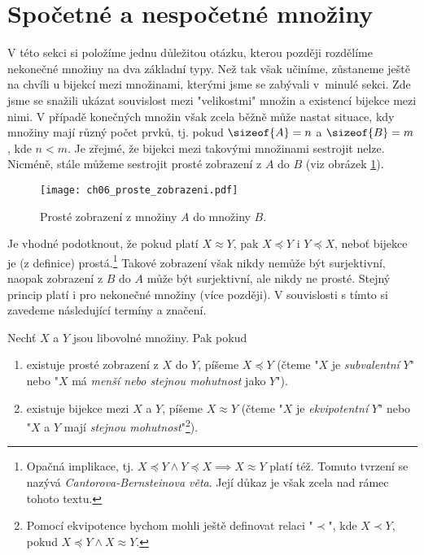 \section{Spočetné a nespočetné množiny}\label{sec:spocetne_a_nespocetne_mnoziny}
V této sekci si položíme jednu důležitou otázku, kterou později rozdělíme nekonečné množiny na dva základní typy. Než tak však učiníme, zůstaneme ještě na chvíli u bijekcí mezi množinami, kterými jsme se zabývali v~minulé sekci. Zde jsme se snažili ukázat souvislost mezi "velikostmi" množin a existencí bijekce mezi nimi. V případě konečných množin však zcela běžně může nastat situace, kdy množiny mají různý počet prvků, tj. pokud $\sizeof{A}=n$ a $\sizeof{B}=m$, kde $n<m$. Je zřejmé, že bijekci mezi takovými množinami sestrojit nelze. Nicméně, stále můžeme sestrojit prosté zobrazení z $A$ do $B$ (viz obrázek \ref{fig:proste_zobrazeni_A_do_B}).
\begin{figure}[H]
    \centering
    \texttt{[image: ch06\_proste\_zobrazeni.pdf]}
    \caption{Prosté zobrazení z množiny $A$ do množiny $B$.}
    \label{fig:proste_zobrazeni_A_do_B}
\end{figure}
Je vhodné podotknout, že pokud platí $X\approx Y$, pak $X\preccurlyeq Y$ i $Y\preccurlyeq X$, neboť bijekce je (z definice) prostá.\footnote{Opačná implikace, tj. $X\preccurlyeq Y \land Y\preccurlyeq X\implies X\approx Y$ platí též. Tomuto tvrzení se nazývá \emph{Cantorova-Bernsteinova věta}. Její důkaz je však zcela nad rámec tohoto textu.}
Takové zobrazení však nikdy nemůže být surjektivní, naopak zobrazení z $B$ do $A$ může být surjektivní, ale nikdy ne prosté. Stejný princip platí i pro nekonečné množiny (více později). V souvislosti s tímto si zavedeme následující termíny a značení.
\begin{definition}\label{def:subvalence_a_ekvipotence}
    Nechť $X$ a $Y$ jsou libovolné množiny. Pak pokud
    \begin{enumerate}[label=(\roman*)]
        \item existuje prosté zobrazení z $X$ do $Y$, píšeme $X\preccurlyeq Y$ (čteme "$X$ je \emph{subvalentní} $Y$" nebo "$X$ má \emph{menší nebo stejnou mohutnost} jako $Y$").
        \item existuje bijekce mezi $X$ a $Y$, píšeme $X\approx Y$ (čteme "$X$ je \emph{ekvipotentní} $Y$" nebo "$X$ a $Y$ mají \emph{stejnou mohutnost}"\footnote{Pomocí ekvipotence bychom mohli ještě definovat relaci "$\prec$", kde $X\prec Y$, pokud $X\preccurlyeq Y \land X\approx Y$.}).
    \end{enumerate}
\end{definition}
